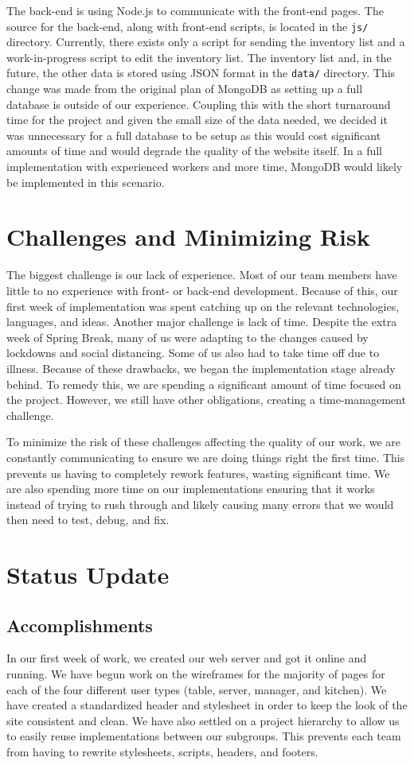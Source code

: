 \documentclass[12pt]{article}
\begin{document}
		The back-end is using Node.js to communicate with the front-end pages. The source for the back-end, along with front-end scripts, is located in the \texttt{js/} directory. Currently, there exists only a script for sending the inventory list and a work-in-progress script to edit the inventory list. The inventory list and, in the future, the other data is stored using JSON format in the \texttt{data/} directory. This change was made from the original plan of MongoDB as setting up a full database is outside of our experience. Coupling this with the short turnaround time for the project and given the small size of the data needed, we decided it was unnecessary for a full database to be setup as this would cost significant amounts of time and would degrade the quality of the website itself. In a full implementation with experienced workers and more time, MongoDB would likely be implemented in this scenario.

	\section{Challenges and Minimizing Risk}
		The biggest challenge is our lack of experience. Most of our team members have little to no experience with front- or back-end development. Because of this, our first week of implementation was spent catching up on the relevant technologies, languages, and ideas. Another major challenge is lack of time. Despite the extra week of Spring Break, many of us were adapting to the changes caused by lockdowns and social distancing. Some of us also had to take time off due to illness. Because of these drawbacks, we began the implementation stage already behind. To remedy this, we are spending a significant amount of time focused on the project. However, we still have other obligations, creating a time-management challenge.

		To minimize the risk of these challenges affecting the quality of our work, we are constantly communicating to ensure we are doing things right the first time. This prevents us having to completely rework features, wasting significant time. We are also spending more time on our implementations ensuring that it works instead of trying to rush through and likely causing many errors that we would then need to test, debug, and fix.


	\section{Status Update}
		\subsection{Accomplishments}
			In our first week of work, we created our web server and got it online and running. We have begun work on the wireframes for the majority of pages for each of the four different user types (table, server, manager, and kitchen). We have created a standardized header and stylesheet in order to keep the look of the site consistent and clean. We have also settled on a project hierarchy to allow us to easily reuse implementations between our subgroups. This prevents each team from having to rewrite stylesheets, scripts, headers, and footers.
\end{document}
